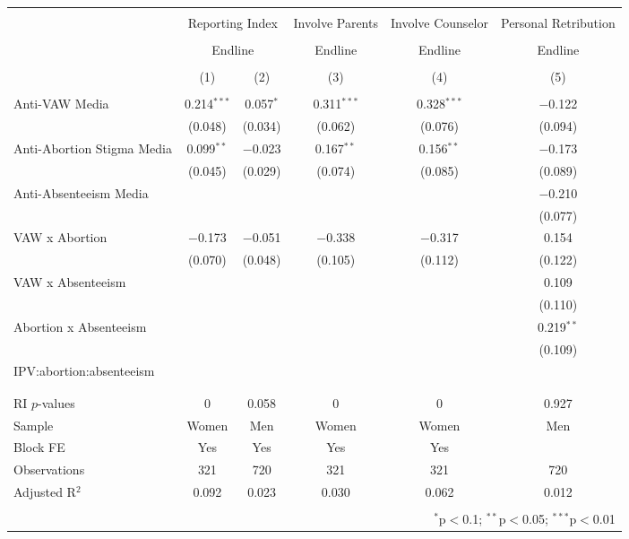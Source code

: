 
\begin{tabular}{@{\extracolsep{5pt}}lccccc} 
\\[-1.8ex]\hline 
\hline \\[-1.8ex] 
 & \multicolumn{2}{c}{Reporting Index} & Involve Parents & Involve Counselor & Personal Retribution \\ 
\\[-1.8ex] & \multicolumn{2}{c}{Endline} & Endline & Endline & Endline \\ 
\\[-1.8ex] & (1) & (2) & (3) & (4) & (5)\\ 
\hline \\[-1.8ex] 
 Anti-VAW Media & 0.214$^{***}$ & 0.057$^{*}$ & 0.311$^{***}$ & 0.328$^{***}$ & $-$0.122 \\ 
  & (0.048) & (0.034) & (0.062) & (0.076) & (0.094) \\ 
  Anti-Abortion Stigma Media & 0.099$^{**}$ & $-$0.023 & 0.167$^{**}$ & 0.156$^{**}$ & $-$0.173 \\ 
  & (0.045) & (0.029) & (0.074) & (0.085) & (0.089) \\ 
  Anti-Absenteeism Media &  &  &  &  & $-$0.210 \\ 
  &  &  &  &  & (0.077) \\ 
  VAW x Abortion & $-$0.173 & $-$0.051 & $-$0.338 & $-$0.317 & 0.154 \\ 
  & (0.070) & (0.048) & (0.105) & (0.112) & (0.122) \\ 
  VAW x Absenteeism &  &  &  &  & 0.109 \\ 
  &  &  &  &  & (0.110) \\ 
  Abortion x Absenteeism &  &  &  &  & 0.219$^{**}$ \\ 
  &  &  &  &  & (0.109) \\ 
  IPV:abortion:absenteeism &  &  &  &  &  \\ 
  &  &  &  &  &  \\ 
 \hline \\[-1.8ex] 
RI $p$-values & 0 & 0.058 & 0 & 0 & 0.927 \\ 
Sample & Women & Men & Women & Women & Men \\ 
Block FE & Yes & Yes & Yes & Yes &  \\ 
Observations & 321 & 720 & 321 & 321 & 720 \\ 
Adjusted R$^{2}$ & 0.092 & 0.023 & 0.030 & 0.062 & 0.012 \\ 
\hline 
\hline \\[-1.8ex] 
\multicolumn{6}{r}{$^{*}$p$<$0.1; $^{**}$p$<$0.05; $^{***}$p$<$0.01} \\ 
\end{tabular} 
